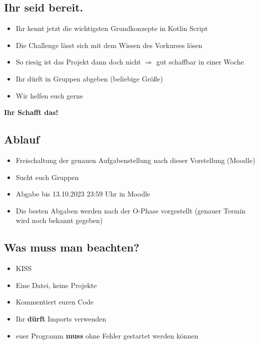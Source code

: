 \subsection{Ihr seid bereit.}
\begin{frame}
    \slidehead
    \begin{itemize}
        \item Ihr kennt jetzt die wichtigsten Grundkonzepte in Kotlin Script
        \item Die Challenge lässt sich mit dem Wissen des Vorkurses lösen
        \item So riesig ist das Projekt dann doch nicht $\Rightarrow$ gut schaffbar in einer Woche
        \item Ihr dürft in Gruppen abgeben (beliebige Größe)
        \item Wir helfen euch gerne
    \end{itemize}
    \pause
    \vspace{\fill}
    \begin{center}
        \textbf{\huge Ihr Schafft das!}
    \end{center}
    \vspace{\fill}
\end{frame}

\subsection{Ablauf}
\begin{frame}
    \slidehead
    \begin{itemize}
        \item Freischaltung der genauen Aufgabenstellung nach dieser Vorstellung (Moodle)
        \item Sucht euch Gruppen
        \item Abgabe bis 13.10.2023 23:59 Uhr in Moodle
        \item Die besten Abgaben werden nach der O-Phase vorgestellt (genauer Termin wird noch bekannt gegeben)
    \end{itemize}
\end{frame}

\subsection{Was muss man beachten?}
\begin{frame}
    \slidehead
    \begin{itemize}
        \item KISS
        \item Eine Datei, keine Projekte
        \item Kommentiert euren Code
        \item Ihr \textbf{dürft} Imports verwenden
        \item euer Programm \textbf{muss} ohne Fehler gestartet werden können
    \end{itemize}
\end{frame}

